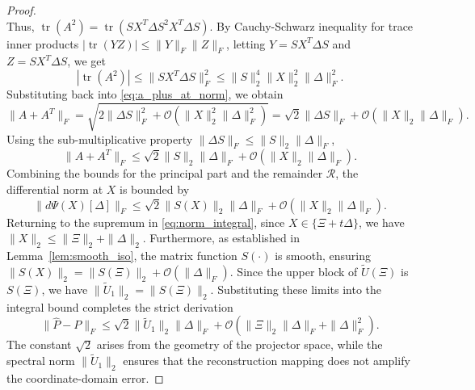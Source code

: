 \documentclass[10pt,a4paper]{amsart}
\begin{document}
\begin{proof}
$$ $$
Thus, $\operatorname{tr}(A^2) = \operatorname{tr}(S X^T \Delta S^2 X^T \Delta S)$. By Cauchy-Schwarz inequality for trace inner products $|\operatorname{tr}(Y Z)| \leq \|Y\|_F \|Z\|_F$, letting $Y = S X^T \Delta S$ and $Z = S X^T \Delta S$, we get
 $$
|\operatorname{tr}(A^2)| \leq \|S X^T \Delta S\|_F^2 \leq \|S\|_2^4 \|X\|_2^2 \|\Delta\|_F^2.
 $$
Substituting back into \eqref{eq:a_plus_at_norm}, we obtain
 $$
\|A + A^T\|_F = \sqrt{2\|\Delta S\|_F^2 + \mathcal{O}(\|X\|_2^2 \|\Delta\|_F^2)} = \sqrt{2} \|\Delta S\|_F + \mathcal{O}(\|X\|_2  \|\Delta\|_F).
 $$
Using the sub-multiplicative property $\|\Delta S\|_F \leq \|S\|_2 \|\Delta\|_F$,
 $$
\|A + A^T\|_F \leq \sqrt{2} \|S\|_2 \|\Delta\|_F + \mathcal{O}(\|X\|_2  \|\Delta\|_F).
 $$
Combining the bounds for the principal part and the remainder $\mathcal{R}$, the differential norm at $X$ is bounded by
 $$
\|d\Psi(X)[\Delta]\|_F \leq \sqrt{2} \|S(X)\|_2 \|\Delta\|_F + \mathcal{O}(\|X\|_2   \|\Delta\|_F).
 $$
Returning to the supremum in \eqref{eq:norm_integral}, since $X \in \{\Xi + t\Delta\}$, we have $\|X\|_2 \leq \|\Xi\|_2 + \|\Delta\|_2$.
Furthermore, as established in Lemma~\ref{lem:smooth_iso}, the matrix function $S(\cdot)$ is smooth, ensuring $\|S(X)\|_2 = \|S(\Xi)\|_2 + \mathcal{O}(\|\Delta\|_F)$.
Since the upper block of $\widetilde U(\Xi)$ is $S(\Xi)$, we have $\|\widetilde U_1\|_2 = \|S(\Xi)\|_2$. Substituting these limits into the integral bound completes the strict derivation
$$
\|\hat{P} - P\|_F \leq \sqrt{2} \|\widetilde U_1\|_2 \|\Delta\|_F + \mathcal{O}(\|\Xi\|_2 \|\Delta\|_F + \|\Delta\|_F^2).
$$
The constant $\sqrt{2}$ arises from the geometry of the projector space, while the spectral norm $\|\widetilde U_1\|_2$ ensures that the reconstruction mapping does not amplify the coordinate-domain error.
\end{proof}
\end{document}
